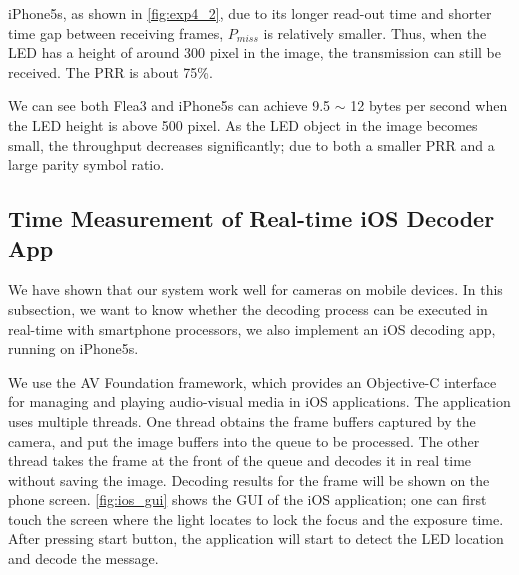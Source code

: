 iPhone5s, as shown in \autoref{fig:exp4_2}, due to its longer read-out time and shorter time gap between receiving frames, $P_{miss}$ is relatively smaller. Thus, when the LED has a height of around 300 pixel in the image, the transmission can still be received. The PRR is about 75\%.
 
 We can see both Flea3 and iPhone5s can achieve 9.5 $\sim$ 12 bytes per second when the LED height is above 500 pixel. As the LED object in the image becomes small, the throughput decreases significantly; due to both a smaller PRR and a large parity symbol ratio.

\subsection{Time Measurement of Real-time iOS Decoder App}
\label{sec:ios_eval}

We have shown that our system work well for cameras on mobile devices. In this subsection, we want to know whether the decoding process can be executed in real-time with smartphone processors, we also implement an iOS decoding app, running on iPhone5s.

We use the AV Foundation framework, which provides an Objective-C interface for managing and playing audio-visual media in iOS applications. The application uses multiple threads. One thread obtains the frame buffers captured by the camera, and put the image buffers into the queue to be processed. The other thread takes the frame at the front of the queue and decodes it in real time without saving the image. Decoding results for the frame will be shown on the phone screen. \autoref{fig:ios_gui} shows the GUI of the iOS application; one can first touch the screen where the light locates to lock the focus and the exposure time. After pressing start button, the application will start to detect the LED location and decode the message.

